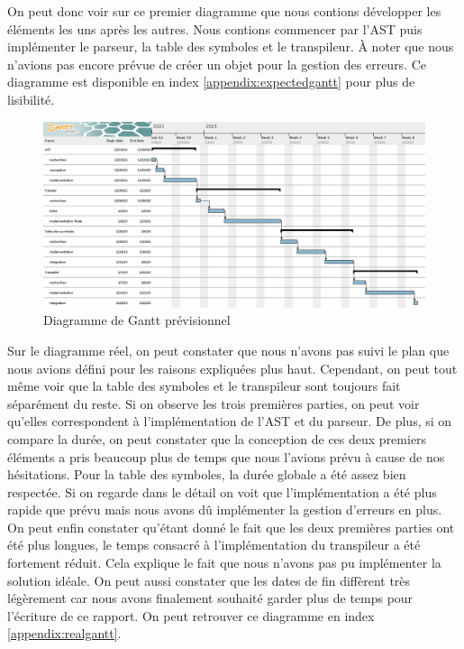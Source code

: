 \documentclass[a4paper]{article}%
\begin{document}
On peut donc voir sur ce premier diagramme que nous contions développer les
éléments les uns après les autres. Nous contions commencer par l'AST puis
implémenter le parseur, la table des symboles et le transpileur. À noter que
nous n'avions pas encore prévue de créer un objet pour la gestion des erreurs.
Ce diagramme est disponible en index \ref{appendix:expectedgantt} pour plus de
lisibilité.

\begin{figure}[h!]
  \begin{center}
  \includegraphics[scale=0.35]{./img/expected-gantt.png}
  \caption{Diagramme de Gantt prévisionnel}
  \end{center}
\end{figure}

Sur le diagramme réel, on peut constater que nous n'avons pas suivi le plan que
nous avions défini pour les raisons expliquées plus haut. Cependant, on peut
tout même voir que la table des symboles et le transpileur sont toujours fait
séparément du reste. Si on observe les trois premières parties, on peut voir
qu'elles correspondent à l'implémentation de l'AST et du parseur. De plus, si on
compare la durée, on peut constater que la conception de ces deux premiers
éléments a pris beaucoup plus de temps que nous l'avions prévu à cause de nos
hésitations. Pour la table des symboles, la durée globale a été assez bien
respectée. Si on regarde dans le détail on voit que l'implémentation a été plus
rapide que prévu mais nous avons dû implémenter la gestion d'erreurs en plus.
On peut enfin constater qu'étant donné le fait que les deux premières parties
ont été plus longues, le temps consacré à l'implémentation du transpileur a été
fortement réduit. Cela explique le fait que nous n'avons pas pu implémenter la
solution idéale. On peut aussi constater que les dates de fin diffèrent très
légèrement car nous avons finalement souhaité garder plus de temps pour
l'écriture de ce rapport. On peut retrouver ce diagramme en index
\ref{appendix:realgantt}.
\end{document}
